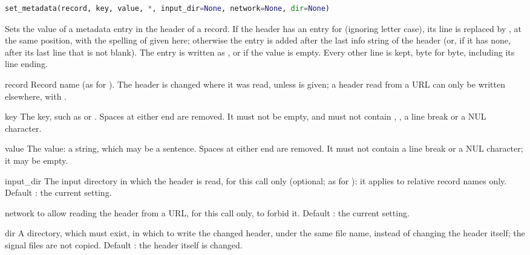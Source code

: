 \begin{lstlisting}[language=Python,style=signature]
set_metadata(record, key, value, *, input_dir=None, network=None, dir=None)
\end{lstlisting}
Sets the value of a metadata entry in the header of a record. If the header has an entry
for  (ignoring letter case), its line is replaced by , at
the same position, with the spelling of  given here; otherwise the entry is
added after the last info string of the header (or, if it has none, after its last line
that is not blank). The entry is written as , or  if
the value is empty. Every other line is kept, byte for byte, including its line ending.
\begin{params}
\item[record] Record name (as for ). The header is changed where it
  was read, unless  is given; a header read from a URL can only be written
  elsewhere, with .
\item[key] The key, such as  or . Spaces at either end
  are removed. It must not be empty, and must not contain \code{:}, \code{\#}, a line
  break or a NUL character.
\item[value] The value: a string, which may be a sentence. Spaces at either end are
  removed. It must not contain a line break or a NUL character; it may be empty.
\item[input\_dir] The input directory in which the header is read, for this call only
  (optional; as for ): it applies to relative record names only.
  Default : the current setting.
\item[network]  to allow reading the header from a URL, for this call only,
   to forbid it. Default : the current setting.
\item[dir] A directory, which must exist, in which to write the changed header, under the
  same file name, instead of changing the header itself; the signal files are not copied.
  Default : the header itself is changed.
\end{params}
